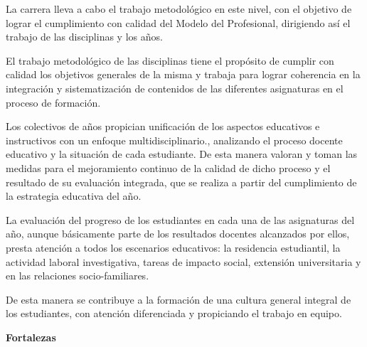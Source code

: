 La carrera lleva a cabo el trabajo metodológico en este nivel, con el objetivo de lograr el cumplimiento con calidad del Modelo del Profesional, dirigiendo así el trabajo de las disciplinas y los años.

El trabajo metodológico de las disciplinas tiene el propósito de cumplir con calidad los objetivos generales de la misma y trabaja para lograr coherencia en la integración y sistematización de contenidos de las diferentes asignaturas en el proceso de formación.

Los colectivos de años propician unificación de los aspectos educativos e instructivos con un enfoque multidisciplinario., analizando el proceso docente educativo y la situación de cada estudiante. De esta manera valoran y toman las medidas para el mejoramiento continuo de la calidad de dicho proceso y el resultado de su evaluación integrada, que se realiza a partir del cumplimiento de la estrategia educativa del año.

La evaluación del progreso de los estudiantes en cada una de las asignaturas del año, aunque básicamente parte de los resultados docentes alcanzados por ellos, presta atención a todos los escenarios educativos: la residencia estudiantil, la actividad laboral investigativa, tareas de impacto social, extensión universitaria y en las relaciones socio-familiares.

De esta manera se contribuye a la formación de una cultura general integral de los estudiantes, con atención diferenciada y propiciando el trabajo en equipo.

\textbf{Fortalezas}

